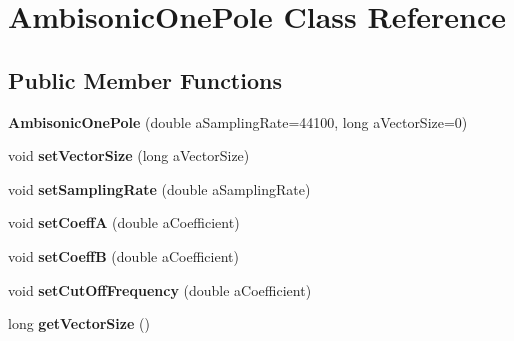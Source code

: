 \hypertarget{class_ambisonic_one_pole}{\section{Ambisonic\-One\-Pole Class Reference}
\label{class_ambisonic_one_pole}
}
\subsection*{Public Member Functions}
\begin{DoxyCompactItemize}
\item 
\hypertarget{class_ambisonic_one_pole_accd0ce7548ef7d6669519769c13eeded}{{\bfseries Ambisonic\-One\-Pole} (double a\-Sampling\-Rate=44100, long a\-Vector\-Size=0)}\label{class_ambisonic_one_pole_accd0ce7548ef7d6669519769c13eeded}

\item 
\hypertarget{class_ambisonic_one_pole_a2d97c8d963dce210a9e8ea8f173f097c}{void {\bfseries set\-Vector\-Size} (long a\-Vector\-Size)}\label{class_ambisonic_one_pole_a2d97c8d963dce210a9e8ea8f173f097c}

\item 
\hypertarget{class_ambisonic_one_pole_a702746459e8377e6315d6b7d2459f205}{void {\bfseries set\-Sampling\-Rate} (double a\-Sampling\-Rate)}\label{class_ambisonic_one_pole_a702746459e8377e6315d6b7d2459f205}

\item 
\hypertarget{class_ambisonic_one_pole_ab4e7e2d7af203355b57a9ff6a35e70f4}{void {\bfseries set\-Coeff\-A} (double a\-Coefficient)}\label{class_ambisonic_one_pole_ab4e7e2d7af203355b57a9ff6a35e70f4}

\item 
\hypertarget{class_ambisonic_one_pole_ace9d1d8b2d27100c126d7e2a57dd0aac}{void {\bfseries set\-Coeff\-B} (double a\-Coefficient)}\label{class_ambisonic_one_pole_ace9d1d8b2d27100c126d7e2a57dd0aac}

\item 
\hypertarget{class_ambisonic_one_pole_a9aecab388d468a2bf741ec851daeec2c}{void {\bfseries set\-Cut\-Off\-Frequency} (double a\-Coefficient)}\label{class_ambisonic_one_pole_a9aecab388d468a2bf741ec851daeec2c}

\item 
\hypertarget{class_ambisonic_one_pole_a2e9fc166a7ee3d43ccadfe6f3308220c}{long {\bfseries get\-Vector\-Size} ()}\label{class_ambisonic_one_pole_a2e9fc166a7ee3d43ccadfe6f3308220c}


\end{DoxyCompactItemize}

